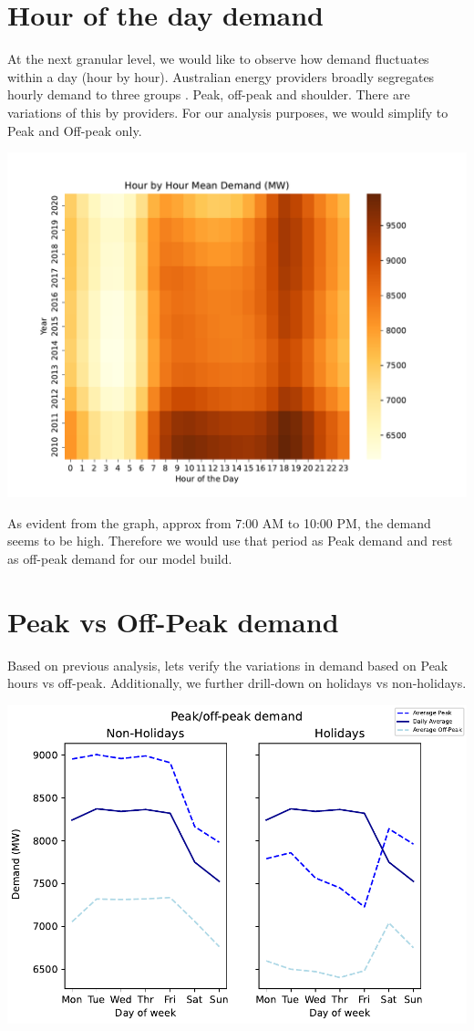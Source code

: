 \documentclass[mstat,12pt]{unswthesis}
\begin{document}
\section{Hour of the day demand}\label{hour-of-the-day-demand}

At the next granular level, we would like to observe how demand
fluctuates within a day (hour by hour). Australian energy providers
broadly segregates hourly demand to three groups
\cite{wrigley_2019_peak}. Peak, off-peak and shoulder. There are
variations of this by providers. For our analysis purposes, we would
simplify to Peak and Off-peak only.

\begin{center}\includegraphics[width=0.5\linewidth]{unsw-ZZSC9020-report-template_files/figure-latex/unnamed-chunk-8-11} \end{center}

As evident from the graph, approx from 7:00 AM to 10:00 PM, the demand
seems to be high. Therefore we would use that period as Peak demand and
rest as off-peak demand for our model build.

\section{Peak vs Off-Peak demand}\label{peak-vs-off-peak-demand}

Based on previous analysis, lets verify the variations in demand based
on Peak hours vs off-peak. Additionally, we further drill-down on
holidays vs non-holidays.

\begin{center}\includegraphics[width=0.75\linewidth]{unsw-ZZSC9020-report-template_files/figure-latex/unnamed-chunk-9-13} \end{center}
\end{document}
